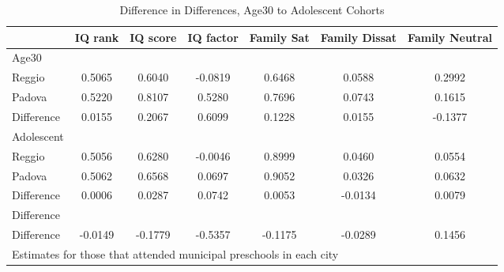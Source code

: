\begin{table}[htbp]\centering
\caption{Difference in Differences, Age30 to Adolescent Cohorts}
\begin{tabular}{l*{6}{c}}
\hline\hline
            &     IQ rank&    IQ score&   IQ factor&  Family Sat&Family Dissat&Family Neutral\\
\hline
Age30       &            &            &            &            &            &            \\
Reggio      &      0.5065&      0.6040&     -0.0819&      0.6468&      0.0588&      0.2992\\
Padova      &      0.5220&      0.8107&      0.5280&      0.7696&      0.0743&      0.1615\\
Difference  &      0.0155&      0.2067&      0.6099&      0.1228&      0.0155&     -0.1377\\
\hline
Adolescent  &            &            &            &            &            &            \\
Reggio      &      0.5056&      0.6280&     -0.0046&      0.8999&      0.0460&      0.0554\\
Padova      &      0.5062&      0.6568&      0.0697&      0.9052&      0.0326&      0.0632\\
Difference  &      0.0006&      0.0287&      0.0742&      0.0053&     -0.0134&      0.0079\\
\hline
Difference  &            &            &            &            &            &            \\
Difference  &     -0.0149&     -0.1779&     -0.5357&     -0.1175&     -0.0289&      0.1456\\
\hline\hline
\multicolumn{7}{l}{\footnotesize Estimates for those that attended municipal preschools in each city}\\
\end{tabular}
\end{table}
